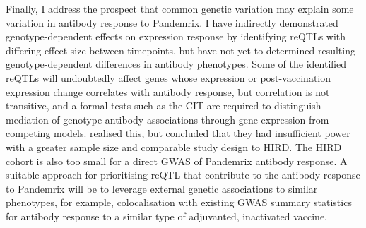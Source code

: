 Finally, I address the prospect that common genetic variation may explain some variation in antibody response to Pandemrix.
I have indirectly demonstrated genotype-dependent effects on expression response by identifying reQTLs with differing effect size between timepoints,
but have not yet to determined resulting genotype-dependent differences in antibody phenotypes.
Some of the identified reQTLs will undoubtedly affect genes whose expression or post-vaccination expression change correlates with antibody response, 
but correlation is not transitive\autocite{langford2001PropertyBeingPositively},
and a formal tests such as the \gls{CIT}\autocite{millstein2009DisentanglingMolecularRelationships} are required to distinguish mediation of genotype-antibody associations through gene expression from competing models.
\autocite{franco2013IntegrativeGenomicAnalysis} realised this, but concluded that they had insufficient power with a greater sample size and comparable study design to \gls{HIRD}.
The \gls{HIRD} cohort is also too small for a direct \gls{GWAS} of Pandemrix antibody response.
A suitable approach for prioritising reQTL that contribute to the antibody response to Pandemrix will be to leverage external genetic associations to similar phenotypes,
for example, colocalisation with existing GWAS summary statistics for antibody response to a similar type of adjuvanted, inactivated vaccine.

